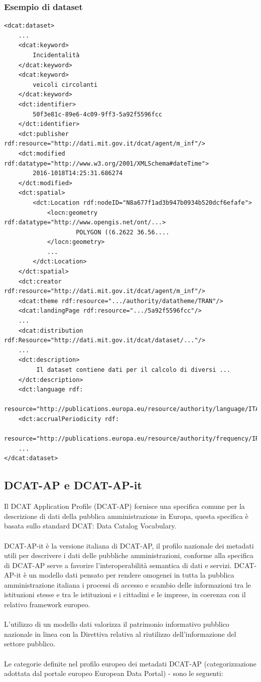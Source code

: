 \documentclass{article}
\theoremstyle{plain}
\theoremstyle{definition}
\begin{document}
\newpage
\subsubsection{Esempio di dataset}
\begin{verbatim}
<dcat:dataset>
    ...
    <dcat:keyword>
        Incidentalità
    </dcat:keyword>
    <dcat:keyword>
        veicoli circolanti
    </dcat:keyword>
    <dct:identifier>
        50f3e81c-89e6-4c09-9ff3-5a92f5596fcc
    </dct:identifier>
    <dct:publisher rdf:resource="http://dati.mit.gov.it/dcat/agent/m_inf"/>
    <dct:modified rdf:datatype="http://www.w3.org/2001/XMLSchema#dateTime">
        2016-1018T14:25:31.686274
    </dct:modified>
    <dct:spatial>
        <dct:Location rdf:nodeID="N8a677f1ad3b947b0934b520dcf6efafe">
            <locn:geometry rdf:datatype="http://www.opengis.net/ont/...>
                    POLYGON ((6.2622 36.56....
            </locn:geometry>
            ...
        </dct:Location>
    </dct:spatial>
    <dct:creator rdf:resource="http://dati.mit.gov.it/dcat/agent/m_inf"/>
    <dcat:theme rdf:resource=".../authority/datatheme/TRAN"/>
    <dcat:landingPage rdf:resource=".../5a92f5596fcc"/>
    ...
    <dcat:distribution rdf:Resource="http://dati.mit.gov.it/dcat/dataset/..."/>
    ...	
    <dct:description>
         Il dataset contiene dati per il calcolo di diversi ...
    </dct:description>
    <dct:language rdf:
        resource="http://publications.europa.eu/resource/authority/language/ITA"/>
    <dct:accrualPeriodicity rdf:
        resource="http://publications.europa.eu/resource/authority/frequency/IRREG"/>
    ...
</dcat:dataset>
\end{verbatim}

\newpage
\subsection{DCAT-AP e DCAT-AP-it}
Il DCAT Application Profile (DCAT-AP) fornisce una specifica comune per la descrizione di dati della pubblica amministrazione in Europa, questa specifica è basata sullo standard DCAT: Data Catalog Vocabulary. \footnotemark
{}
\\
\\
DCAT-AP-it è la versione italiana di DCAT-AP, il profilo nazionale dei metadati utili per descrivere i dati delle pubbliche amministrazioni, conforme alla specifica di DCAT-AP serve a favorire l'interoperabilità semantica di dati e servizi. DCAT-AP-it è un modello dati pensato per rendere omogenei in tutta la pubblica amministrazione italiana i processi di accesso e scambio delle informazioni tra le istituzioni stesse e tra le istituzioni e i cittadini e le imprese, in coerenza con il relativo framework europeo. 
\\
\\
L'utilizzo di un modello dati valorizza il patrimonio informativo pubblico nazionale in linea con la Direttiva relativa al riutilizzo dell'informazione del settore pubblico.
\\
\\
Le categorie definite nel profilo europeo dei metadati DCAT-AP (categorizzazione adottata dal portale europeo European Data Portal) - sono le seguenti:
\end{document}
